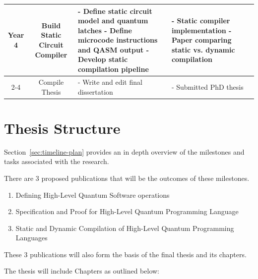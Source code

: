 \documentclass[journal,onecolumn, compsoc]{IEEEtran}
\begin{document}
\begin{table}[H]
\begin{tabular}{@{}c|c|p{6cm}|p{5cm}@{}}
\multirow{2}{*}{Year 4} 
& Build Static Circuit Compiler 
& - Define static circuit model and quantum latches \newline
  - Define microcode instructions and QASM output \newline
  - Develop static compilation pipeline 
& - Static compiler implementation \newline
  - Paper comparing static vs. dynamic compilation \\
\cmidrule{2-4}

& Compile Thesis 
& - Write and edit final dissertation 
& - Submitted PhD thesis \\
\bottomrule
\end{tabular}
\end{table}




\section{Thesis Structure}
Section~\ref{sec:timeline-plan} provides an in depth overview of the milestones and tasks associated with the research.

There are 3 proposed publications that will be the outcomes of these milestones.
\begin{enumerate}
    \item Defining High-Level Quantum Software operations
    \item Specification and Proof for High-Level Quantum Programming Language
    \item Static and Dynamic Compilation of High-Level Quantum Programming Languages
\end{enumerate}

These 3 publications will also form the basis of the final thesis and its chapters.

The thesis will include Chapters as outlined below:
\end{document}
